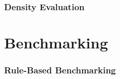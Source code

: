 \documentclass{beamer}
\begin{document}
\begin{frame}
  \frametitle{Density Evaluation}
\end{frame}


\section{Benchmarking}


\begin{frame}
  \frametitle{Rule-Based Benchmarking}
\end{frame}
\end{document}
